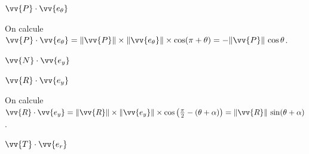 
\begin{enonce}
$\vv{P}\cdot\vv{e_\theta}$
\end{enonce}


\begin{corrige}
	On calcule $\vv{P}\cdot\vv{e_\theta}
		= \Arrowvert\vv{P}\Arrowvert\times
			\Arrowvert\vv{e_\theta}\Arrowvert\times
			\cos(\pi + \theta)
		= -\Arrowvert\vv{P}\Arrowvert\,\cos\theta$.
\end{corrige}




\begin{enonce}
$\vv{N}\cdot\vv{e_y}$
\end{enonce}





\begin{enonce}
$\vv{R}\cdot\vv{e_y}$
\end{enonce}


\begin{corrige}
	On calcule $\vv{R}\cdot\vv{e_y}
		= \Arrowvert\vv{R}\Arrowvert\times
			\Arrowvert\vv{e_y}\Arrowvert\times
			\cos\left(\frac{\pi}{2} - (\theta + \alpha)\right)
		= \Arrowvert\vv{R}\Arrowvert\,\sin(\theta + \alpha)$.
\end{corrige}




\begin{enonce}
$\vv{T}\cdot\vv{e_r}$
\end{enonce}

